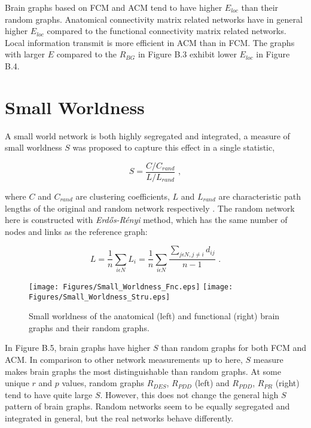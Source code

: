 Brain graphs based on FCM and ACM tend to have higher $E_{loc}$ than their random graphs. Anatomical connectivity matrix related networks have in general higher $E_{loc}$ compared to the functional connectivity matrix related networks. Local information transmit is more efficient in ACM than in FCM. The graphs with larger $E$ compared to the $R_{BG}$ in Figure B.3 exhibit lower $E_{loc}$ in Figure B.4.   


\section{Small Worldness}

A small world network is both highly segregated and integrated, a measure of small worldness $S$ was proposed to capture this effect in a single statistic,

\begin{equation}
S = \frac{C/C_{rand}}{L/L_{rand}} \,\, ,
\end{equation}
 
where $C$ and $C_{rand}$ are clustering coefficients, $L$ and $L_{rand}$ are characteristic path lengths of the original and random network respectively \citep{HUM08}. The random network here is constructed with \textit{Erd\H{o}s-R\'{e}nyi} method, which has the same number of nodes and links as the reference graph:

\begin{equation}
L = \frac{1}{n}\sum\limits_{i \epsilon N} L_i = \frac{1}{n}\sum\limits_{i \epsilon N} \frac{\sum\limits_{j \epsilon N, j \neq i }d_{ij}}{n-1 } \,\, .
\end{equation}


\begin{figure}[htbp]
 
  \centering
	 \texttt{[image: Figures/Small\_Worldness\_Fnc.eps]}
	 \texttt{[image: Figures/Small\_Worldness\_Stru.eps]}
  \caption[Small Worldness]{Small worldness of the anatomical (left) and functional (right) brain graphs and their random graphs.} 
    \label{fig:Small Worldness}
 	
\end{figure}


In Figure B.5, brain graphs have higher $S$ than random graphs for both FCM and ACM. In comparison to other network measurements up to here, $S$ measure makes brain graphs the most distinguishable than random graphs. At some unique $r$ and $p$ values, random graphs $R_{DES}$, $R_{PDD}$ (left) and $R_{PDD}$, $R_{PR}$ (right) tend to have quite large $S$. However, this does not change the general high $S$ pattern of brain graphs. Random networks seem to be equally segregated and integrated in general, but the real networks behave differently. 



